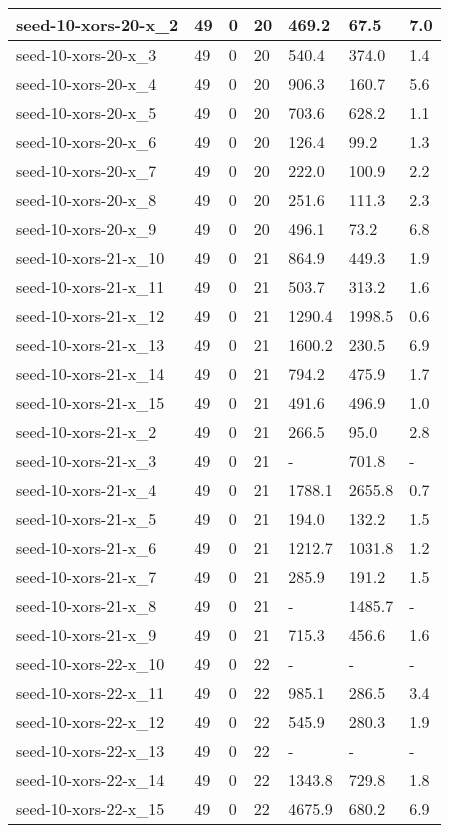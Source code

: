 \begin{scriptsize}
\begin{longtable}{|p{5cm}|l|l|l|l|l|l|}
seed-10-xors-20-x\_2&49&0&20&469.2&67.5&7.0 \\ \hline 
seed-10-xors-20-x\_3&49&0&20&540.4&374.0&1.4 \\ \hline 
seed-10-xors-20-x\_4&49&0&20&906.3&160.7&5.6 \\ \hline 
seed-10-xors-20-x\_5&49&0&20&703.6&628.2&1.1 \\ \hline 
seed-10-xors-20-x\_6&49&0&20&126.4&99.2&1.3 \\ \hline 
seed-10-xors-20-x\_7&49&0&20&222.0&100.9&2.2 \\ \hline 
seed-10-xors-20-x\_8&49&0&20&251.6&111.3&2.3 \\ \hline 
seed-10-xors-20-x\_9&49&0&20&496.1&73.2&6.8 \\ \hline 
seed-10-xors-21-x\_10&49&0&21&864.9&449.3&1.9 \\ \hline 
seed-10-xors-21-x\_11&49&0&21&503.7&313.2&1.6 \\ \hline 
seed-10-xors-21-x\_12&49&0&21&1290.4&1998.5&0.6 \\ \hline 
seed-10-xors-21-x\_13&49&0&21&1600.2&230.5&6.9 \\ \hline 
seed-10-xors-21-x\_14&49&0&21&794.2&475.9&1.7 \\ \hline 
seed-10-xors-21-x\_15&49&0&21&491.6&496.9&1.0 \\ \hline 
seed-10-xors-21-x\_2&49&0&21&266.5&95.0&2.8 \\ \hline 
seed-10-xors-21-x\_3&49&0&21&-&701.8&- \\ \hline 
seed-10-xors-21-x\_4&49&0&21&1788.1&2655.8&0.7 \\ \hline 
seed-10-xors-21-x\_5&49&0&21&194.0&132.2&1.5 \\ \hline 
seed-10-xors-21-x\_6&49&0&21&1212.7&1031.8&1.2 \\ \hline 
seed-10-xors-21-x\_7&49&0&21&285.9&191.2&1.5 \\ \hline 
seed-10-xors-21-x\_8&49&0&21&-&1485.7&- \\ \hline 
seed-10-xors-21-x\_9&49&0&21&715.3&456.6&1.6 \\ \hline 
seed-10-xors-22-x\_10&49&0&22&-&-&- \\ \hline 
seed-10-xors-22-x\_11&49&0&22&985.1&286.5&3.4 \\ \hline 
seed-10-xors-22-x\_12&49&0&22&545.9&280.3&1.9 \\ \hline 
seed-10-xors-22-x\_13&49&0&22&-&-&- \\ \hline 
seed-10-xors-22-x\_14&49&0&22&1343.8&729.8&1.8 \\ \hline 
seed-10-xors-22-x\_15&49&0&22&4675.9&680.2&6.9 \\ \hline 

\end{longtable}
\end{scriptsize}

